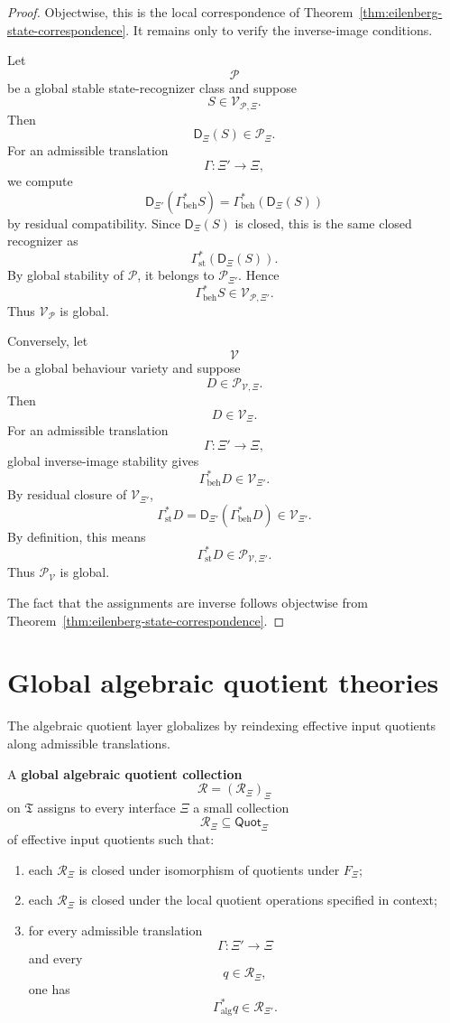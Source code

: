 \begin{proof}
Objectwise, this is the local correspondence of
Theorem~\ref{thm:eilenberg-state-correspondence}. It remains only to verify
the inverse-image conditions.

Let
\[
\mathcal P
\]
be a global stable state-recognizer class and suppose
\[
S\in\mathcal V_{\mathcal P,\Xi}.
\]
Then
\[
\mathsf D_\Xi(S)\in\mathcal P_\Xi.
\]
For an admissible translation
\[
\Gamma:\Xi'\to\Xi,
\]
we compute
\[
\mathsf D_{\Xi'}(\Gamma_{\mathrm{beh}}^\ast S)
=
\Gamma_{\mathrm{beh}}^\ast(\mathsf D_\Xi(S))
\]
by residual compatibility. Since \(\mathsf D_\Xi(S)\) is closed, this is the
same closed recognizer as
\[
\Gamma_{\mathrm{st}}^\ast(\mathsf D_\Xi(S)).
\]
By global stability of \(\mathcal P\), it belongs to \(\mathcal P_{\Xi'}\).
Hence
\[
\Gamma_{\mathrm{beh}}^\ast S
\in
\mathcal V_{\mathcal P,\Xi'}.
\]
Thus \(\mathcal V_{\mathcal P}\) is global.

Conversely, let
\[
\mathcal V
\]
be a global behaviour variety and suppose
\[
D\in\mathcal P_{\mathcal V,\Xi}.
\]
Then
\[
D\in\mathcal V_\Xi.
\]
For an admissible translation
\[
\Gamma:\Xi'\to\Xi,
\]
global inverse-image stability gives
\[
\Gamma_{\mathrm{beh}}^\ast D\in\mathcal V_{\Xi'}.
\]
By residual closure of \(\mathcal V_{\Xi'}\),
\[
\Gamma_{\mathrm{st}}^\ast D
=
\mathsf D_{\Xi'}(\Gamma_{\mathrm{beh}}^\ast D)
\in
\mathcal V_{\Xi'}.
\]
By definition, this means
\[
\Gamma_{\mathrm{st}}^\ast D\in\mathcal P_{\mathcal V,\Xi'}.
\]
Thus \(\mathcal P_{\mathcal V}\) is global.

The fact that the assignments are inverse follows objectwise from
Theorem~\ref{thm:eilenberg-state-correspondence}.
\end{proof}

\section{Global algebraic quotient theories}
\label{sec:eilenberg-global-algebraic-quotient-theories}

The algebraic quotient layer globalizes by reindexing effective input
quotients along admissible translations.

\begin{definition}
\label{def:eilenberg-global-algebraic-quotient-collection}
A \textbf{global algebraic quotient collection}
\[
\mathcal R=(\mathcal R_\Xi)_\Xi
\]
on \(\mathfrak T\) assigns to every interface \(\Xi\) a small collection
\[
\mathcal R_\Xi\subseteq\mathsf{Quot}_\Xi
\]
of effective input quotients such that:
\begin{enumerate}
\item each \(\mathcal R_\Xi\) is closed under isomorphism of quotients under
\(F_\Xi\);
\item each \(\mathcal R_\Xi\) is closed under the local quotient operations
specified in context;
\item for every admissible translation
\[
\Gamma:\Xi'\to\Xi
\]
and every
\[
q\in\mathcal R_\Xi,
\]
one has
\[
\Gamma_{\mathrm{alg}}^\ast q\in\mathcal R_{\Xi'}.
\]
\end{enumerate}
\end{definition}

